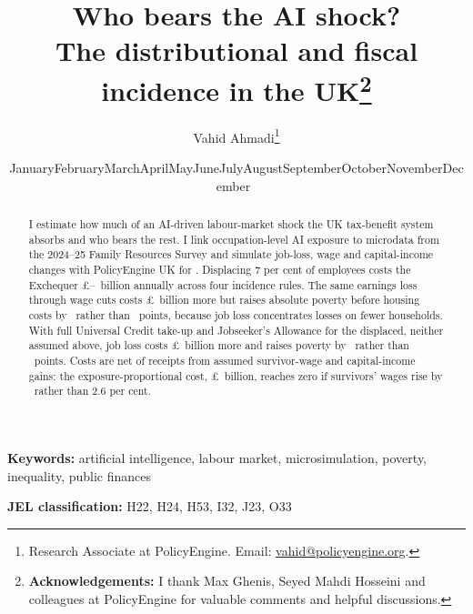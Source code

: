 \documentclass[11pt]{article}
\title{\bfseries Who bears the AI shock?\\[0.15cm] The distributional and fiscal incidence in the UK\thanks{\textbf{Acknowledgements:} I thank Max Ghenis, Seyed Mahdi Hosseini and colleagues at PolicyEngine for valuable comments and helpful discussions.}\\[0.7cm]}
\author{Vahid Ahmadi\thanks{Research Associate at PolicyEngine. Email: \href{mailto:vahid@policyengine.org}{vahid@policyengine.org}.}}
\date{\small \ifcase\month\or January\or February\or March\or April\or May\or June\or July\or August\or September\or October\or November\or December\fi\ \the\year}
\begin{document}
\maketitle

\begin{abstract}
\noindent I estimate how much of an AI-driven labour-market shock the UK tax-benefit system absorbs and who bears the rest. I link occupation-level AI exposure to microdata from the 2024--25 Family Resources Survey and simulate job-loss, wage and capital-income changes with PolicyEngine UK for \genModelFiscalYear. Displacing 7 per cent of employees costs the Exchequer \pounds\genIncUniformCostMeanBn--\genIncCompressionCostMeanBn~billion annually across four incidence rules. The same earnings loss through wage cuts costs \pounds\genWcPairCostDiffAbsBn~billion more but raises absolute poverty before housing costs by \genWcWagePovBhcMeanOneDpPp~rather than \genWcJobPovBhcMeanOneDpPp~points, because job loss concentrates losses on fewer households. With full Universal Credit take-up and Jobseeker's Allowance for the displaced, neither assumed above, job loss costs \pounds\genTkCentralJsaCostDiffAbsBn~billion more and raises poverty by \genTkCentralJsaPovBhcMeanOneDpPp~rather than \genWcJobPovBhcMeanOneDpPp~points. Costs are net of receipts from assumed survivor-wage and capital-income gains: the exposure-proportional cost, \pounds\genCentralMcCostMeanBn~billion, reaches zero if survivors' wages rise by \genBeWagePct~rather than 2.6 per cent.
\end{abstract}

\medskip
\noindent\textbf{Keywords:} artificial intelligence, labour market, microsimulation, poverty, inequality, public finances

\noindent\textbf{JEL classification:} H22, H24, H53, I32, J23, O33

\newpage






\label{pg:mainend}%

\clearpage

\clearpage

\end{document}
